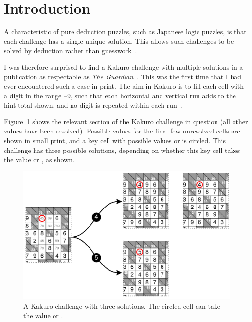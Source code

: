 \documentclass[12pt]{gapd}
\begin{document}
\maketitle

\section{Introduction}
\label{sec:Introduction}

\lettrine{A}{} characteristic of pure deduction puzzles,
such as Japanese logic puzzles, is that each challenge has a single
unique solution.  This allows such challenges to be solved by
deduction rather than guesswork~\cite{browne}.

I was therefore surprised to find a Kakuro challenge with multiple
solutions in a publication as respectable as \textit{The
  Guardian}~\cite{guardian}.  This was the first time that I had ever
encountered such a case in print.  The aim in Kakuro is to fill each
cell with a digit in the range {--9}, such that each horizontal
and vertical run adds to the hint total shown, and no digit is
repeated within each run~\cite{nikoli}.

Figure~\ref{fig:Kakuro} shows the relevant section of the Kakuro
challenge in question (all other values have been resolved).  Possible
values for the final few unresolved cells are shown in small print,
and a key cell with possible values {} or {} is circled.
This challenge has three possible solutions, depending on whether this
key cell takes the value {} or {}, as shown.

\begin{figure}[!thb]
  \centering
  \includegraphics[width=\linewidth]{graphics/kakuro-1372-multiple-1.pdf}
  \caption{A Kakuro challenge with three solutions. The circled cell
    can take the value {} or {}.}
  \label{fig:Kakuro}
\end{figure}
\end{document}
